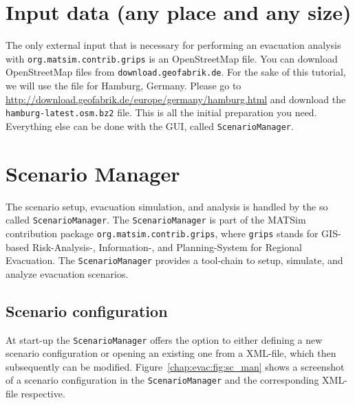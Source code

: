 \section{Input data (any place and any size)}\label{grips:input}
The only external input that is necessary for performing an evacuation analysis with \verb|org.matsim.contrib.grips| is an OpenStreetMap file.
You can download OpenStreetMap files from 
\verb+download.geofabrik.de+.
For the sake of this tutorial, we will use the file for Hamburg, Germany. 
Please go to \url{http://download.geofabrik.de/europe/germany/hamburg.html} and download the \verb+hamburg-latest.osm.bz2+ file. This is all the initial preparation you need. Everything else can 
be done with the GUI, called \verb+ScenarioManager+.

\section{Scenario Manager}\label{grips:scm}

The scenario setup, evacuation simulation, and analysis is handled by the so called \verb+ScenarioManager+.
The \verb+ScenarioManager+ is part of the MATSim contribution package \verb+org.matsim.contrib.grips+, where \verb+grips+ stands for GIS-based Risk-Analysis-, Information-, and Planning-System for Regional Evacuation.
The \verb+ScenarioManager+ provides a tool-chain to setup, simulate, and analyze evacuation scenarios.

\subsection{Scenario configuration}


 At start-up the \verb+ScenarioManager+ offers the option to either defining a new scenario configuration or opening an existing one from a XML-file, which then subsequently can be modified. Figure~\ref{chap:evac:fig:sc_man} shows a screenshot of a scenario configuration in the \verb+ScenarioManager+ and the corresponding XML-file respective.


